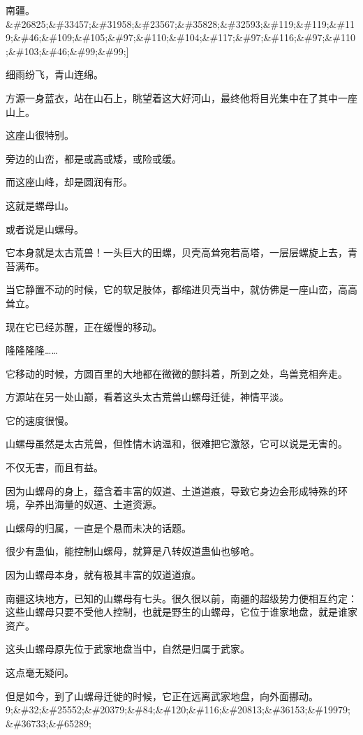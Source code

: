 
\begin{this_body}

南疆。\&\#26825;\&\#33457;\&\#31958;\&\#23567;\&\#35828;\&\#32593;\&\#119;\&\#119;\&\#119;\&\#46;\&\#109;\&\#105;\&\#97;\&\#110;\&\#104;\&\#117;\&\#97;\&\#116;\&\#97;\&\#110;\&\#103;\&\#46;\&\#99;\&\#99;]

细雨纷飞，青山连绵。

方源一身蓝衣，站在山石上，眺望着这大好河山，最终他将目光集中在了其中一座山上。

这座山很特别。

旁边的山峦，都是或高或矮，或险或缓。

而这座山峰，却是圆润有形。

这就是螺母山。

或者说是山螺母。

它本身就是太古荒兽！一头巨大的田螺，贝壳高耸宛若高塔，一层层螺旋上去，青苔满布。

当它静置不动的时候，它的软足肢体，都缩进贝壳当中，就仿佛是一座山峦，高高耸立。

现在它已经苏醒，正在缓慢的移动。

隆隆隆隆……

它移动的时候，方圆百里的大地都在微微的颤抖着，所到之处，鸟兽竞相奔走。

方源站在另一处山巅，看着这头太古荒兽山螺母迁徙，神情平淡。

它的速度很慢。

山螺母虽然是太古荒兽，但性情木讷温和，很难把它激怒，它可以说是无害的。

不仅无害，而且有益。

因为山螺母的身上，蕴含着丰富的奴道、土道道痕，导致它身边会形成特殊的环境，孕养出海量的奴道、土道资源。

山螺母的归属，一直是个悬而未决的话题。

很少有蛊仙，能控制山螺母，就算是八转奴道蛊仙也够呛。

因为山螺母本身，就有极其丰富的奴道道痕。

南疆这块地方，已知的山螺母有七头。很久很以前，南疆的超级势力便相互约定：这些山螺母只要不受他人控制，也就是野生的山螺母，它位于谁家地盘，就是谁家资产。

这头山螺母原先位于武家地盘当中，自然是归属于武家。

这点毫无疑问。

但是如今，到了山螺母迁徙的时候，它正在远离武家地盘，向外面挪动。9;\&\#32;\&\#25552;\&\#20379;\&\#84;\&\#120;\&\#116;\&\#20813;\&\#36153;\&\#19979;\&\#36733;\&\#65289;


\end{this_body}
